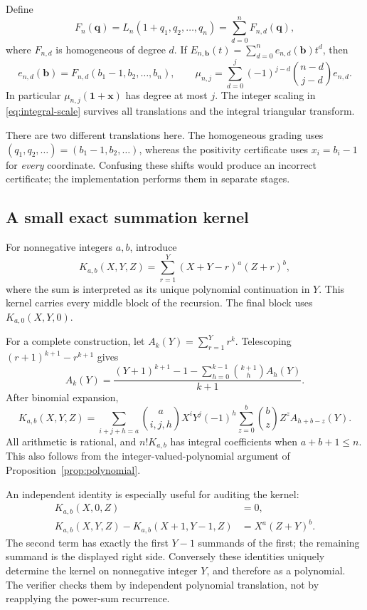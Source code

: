 \documentclass[11pt]{article}
\theoremstyle{definition}
\newcommand{\bb}{\mathbf b}
\newcommand{\xx}{\mathbf x}
\newcommand{\qq}{\mathbf q}
\newcommand{\one}{\mathbf 1}
\numberwithin{equation}{section}
\begin{document}
Define
\[
 F_n(\qq)=L_n(1+q_1,q_2,\ldots,q_n)
     =\sum_{d=0}^n F_{n,d}(\qq),
\]
where $F_{n,d}$ is homogeneous of degree $d$. If
$E_{n,\bb}(t)=\sum_{d=0}^n e_{n,d}(\bb)t^d$, then
\begin{equation}
 e_{n,d}(\bb)=F_{n,d}(b_1-1,b_2,\ldots,b_n),\qquad
 \mu_{n,j}=\sum_{d=0}^j(-1)^{j-d}\binom{n-d}{j-d}e_{n,d}.
 \label{eq:triangular-transform}
\end{equation}
In particular $\mu_{n,j}(\one+\xx)$ has degree at most $j$.
The integer scaling in \eqref{eq:integral-scale} survives all translations
and the integral triangular transform.

There are two different translations here. The homogeneous grading uses
$(q_1,q_2,\ldots)=(b_1-1,b_2,\ldots)$, whereas the positivity certificate
uses $x_i=b_i-1$ for \emph{every} coordinate. Confusing these shifts would
produce an incorrect certificate; the implementation performs them in
separate stages.

\subsection{A small exact summation kernel}
For nonnegative integers $a,b$, introduce
\begin{equation}
 K_{a,b}(X,Y,Z)=\sum_{r=1}^{Y}(X+Y-r)^a(Z+r)^b,
 \label{eq:kernel}
\end{equation}
where the sum is interpreted as its unique polynomial continuation in $Y$.
This kernel carries every middle block of the recursion. The final block
uses $K_{a,0}(X,Y,0)$.

For a complete construction, let $A_k(Y)=\sum_{r=1}^Yr^k$. Telescoping
$(r+1)^{k+1}-r^{k+1}$ gives
\begin{equation}
 A_k(Y)=\frac{(Y+1)^{k+1}-1-
               \sum_{h=0}^{k-1}\binom{k+1}{h}A_h(Y)}{k+1}.
 \label{eq:power-sum}
\end{equation}
After binomial expansion,
\begin{equation}
 K_{a,b}(X,Y,Z)=
 \sum_{i+j+h=a}\binom{a}{i,j,h}X^iY^j(-1)^h
 \sum_{z=0}^{b}\binom bz Z^z A_{h+b-z}(Y).
 \label{eq:kernel-expansion}
\end{equation}
All arithmetic is rational, and $n!K_{a,b}$ has integral coefficients when
$a+b+1\le n$. This also follows from the integer-valued-polynomial argument
of Proposition~\ref{prop:polynomial}.

An independent identity is especially useful for auditing the kernel:
\begin{align}
 K_{a,b}(X,0,Z)&=0,\label{eq:kernel-boundary}\\
 K_{a,b}(X,Y,Z)-K_{a,b}(X+1,Y-1,Z)
     &=X^a(Z+Y)^b.\label{eq:kernel-difference}
\end{align}
The second term has exactly the first $Y-1$ summands of the first; the
remaining summand is the displayed right side. Conversely these identities
uniquely determine the kernel on nonnegative integer $Y$, and therefore
as a polynomial. The verifier checks them by independent polynomial
translation, not by reapplying the power-sum recurrence.
\end{document}
